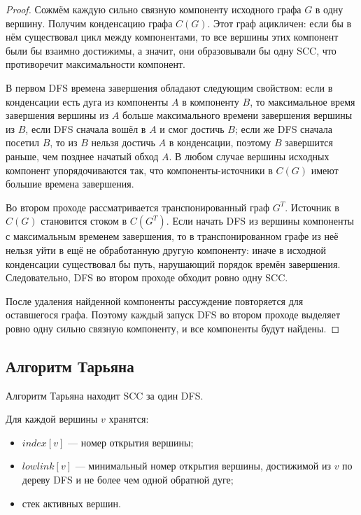 \documentclass[12pt,a4paper]{article}
\begin{document}
\begin{proof}
Сожмём каждую сильно связную компоненту исходного графа $G$ в одну вершину. Получим конденсацию графа $C(G)$. Этот граф ацикличен: если бы в нём существовал цикл между компонентами, то все вершины этих компонент были бы взаимно достижимы, а значит, они образовывали бы одну SCC, что противоречит максимальности компонент.

В первом DFS времена завершения обладают следующим свойством: если в конденсации есть дуга из компоненты $A$ в компоненту $B$, то максимальное время завершения вершины из $A$ больше максимального времени завершения вершины из $B$, если DFS сначала вошёл в $A$ и смог достичь $B$; если же DFS сначала посетил $B$, то из $B$ нельзя достичь $A$ в конденсации, поэтому $B$ завершится раньше, чем позднее начатый обход $A$. В любом случае вершины исходных компонент упорядочиваются так, что компоненты-источники в $C(G)$ имеют большие времена завершения.

Во втором проходе рассматривается транспонированный граф $G^T$. Источник в $C(G)$ становится стоком в $C(G^T)$. Если начать DFS из вершины компоненты с максимальным временем завершения, то в транспонированном графе из неё нельзя уйти в ещё не обработанную другую компоненту: иначе в исходной конденсации существовал бы путь, нарушающий порядок времён завершения. Следовательно, DFS во втором проходе обходит ровно одну SCC.

После удаления найденной компоненты рассуждение повторяется для оставшегося графа. Поэтому каждый запуск DFS во втором проходе выделяет ровно одну сильно связную компоненту, и все компоненты будут найдены.
\end{proof}

\subsection{Алгоритм Тарьяна}

Алгоритм Тарьяна находит SCC за один DFS.

Для каждой вершины $v$ хранятся:
\begin{itemize}
    \item $index[v]$ --- номер открытия вершины;
    \item $lowlink[v]$ --- минимальный номер открытия вершины, достижимой из $v$ по дереву DFS и не более чем одной обратной дуге;
    \item стек активных вершин.
\end{itemize}
\end{document}
